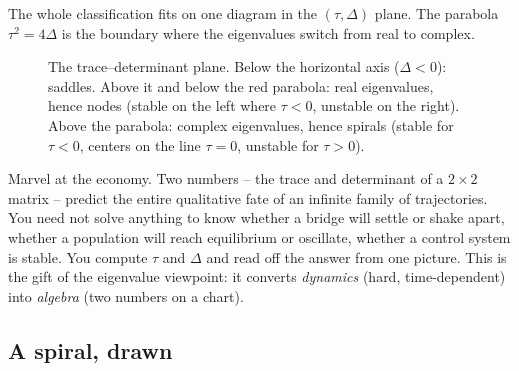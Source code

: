 The whole classification fits on one diagram in the $(\tau, \Delta)$ plane. The
parabola $\tau^2 = 4\Delta$ is the boundary where the eigenvalues switch from
real to complex.

\begin{figure}[H]
\centering
{}
\caption{The trace--determinant plane. Below the horizontal axis ($\Delta<0$):
saddles. Above it and below the red parabola: real eigenvalues, hence nodes
(stable on the left where $\tau<0$, unstable on the right). Above the parabola:
complex eigenvalues, hence spirals (stable for $\tau<0$, centers on the line
$\tau=0$, unstable for $\tau>0$).}
\label{ch39:fig-tracedet}
\end{figure}

\begin{aestheticbox}
Marvel at the economy. Two numbers -- the trace and determinant of a $2\times2$
matrix -- predict the entire qualitative fate of an infinite family of
trajectories. You need not solve anything to know whether a bridge will settle or
shake apart, whether a population will reach equilibrium or oscillate, whether a
control system is stable. You compute $\tau$ and $\Delta$ and read off the
answer from one picture. This is the gift of the eigenvalue viewpoint: it
converts \emph{dynamics} (hard, time-dependent) into \emph{algebra} (two numbers
on a chart).
\end{aestheticbox}

\subsection{A spiral, drawn}

